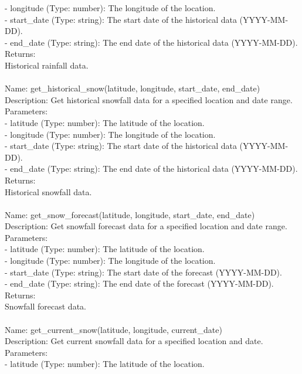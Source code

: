 \begin{tcolorbox}[breakable,title=Prompt Details for Weather]
- longitude (Type: number): The longitude of the location.\\
- start\_date (Type: string): The start date of the historical data (YYYY-MM-DD).\\
- end\_date (Type: string): The end date of the historical data (YYYY-MM-DD).\\
Returns:\\
Historical rainfall data.\\
\\
Name: get\_historical\_snow(latitude, longitude, start\_date, end\_date)\\
Description: Get historical snowfall data for a specified location and date range.\\
Parameters:\\
- latitude (Type: number): The latitude of the location.\\
- longitude (Type: number): The longitude of the location.\\
- start\_date (Type: string): The start date of the historical data (YYYY-MM-DD).\\
- end\_date (Type: string): The end date of the historical data (YYYY-MM-DD).\\
Returns:\\
Historical snowfall data.\\
\\
Name: get\_snow\_forecast(latitude, longitude, start\_date, end\_date)\\
Description: Get snowfall forecast data for a specified location and date range.\\
Parameters:\\
- latitude (Type: number): The latitude of the location.\\
- longitude (Type: number): The longitude of the location.\\
- start\_date (Type: string): The start date of the forecast (YYYY-MM-DD).\\
- end\_date (Type: string): The end date of the forecast (YYYY-MM-DD).\\
Returns:\\
Snowfall forecast data.\\
\\
Name: get\_current\_snow(latitude, longitude, current\_date)\\
Description: Get current snowfall data for a specified location and date.\\
Parameters:\\
- latitude (Type: number): The latitude of the location.\\

\end{tcolorbox}
